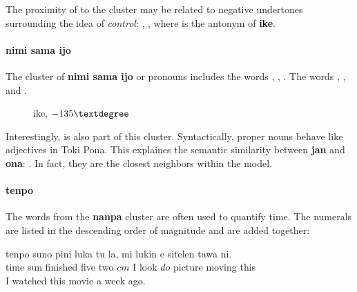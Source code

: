\documentclass[14pt, a4paper]{extreport}
\makeatletter
\DeclareRobustCommand\ttfamily
        {\not@math@alphabet\ttfamily\mathtt
         \fontfamily\ttdefault\small\selectfont}
\makeatother
\begin{document}
The proximity of  to the cluster may be related to negative undertones surrounding the idea of \textit{control}: , , where  is the antonym of \textbf{ike}.
        \paragraph{nimi sama ijo}
The cluster of \textbf{nimi sama ijo} or pronouns includes the words , , . The words , , and .

\begin{figure}[ht]%
  \def\angle{-135}
  \bigskip
  \centering
  \caption{ike, \(\angle\textdegree\)}
\end{figure}%

Interestingly,  is also part of this cluster. Syntactically, proper nouns behave like adjectives in Toki Pona. This explaines the semantic similarity between \textbf{jan} and \textbf{ona}: . In fact, they are the closest neighbors within the model.
      \paragraph{tenpo}
The words from the \textbf{nanpa} cluster are often used to quantify time. The numerals are listed in the descending order of magnitude and are added together:

\begin{exe}
  \ex
  \gll tenpo suno pini luka tu la, mi lukin e sitelen tawa ni. \\
       time sun finished five two $cm$ I look $do$ picture moving this \\
  \glt I watched this movie a week ago.
\end{exe}
\end{document}
